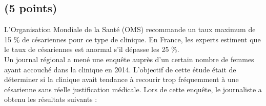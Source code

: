 \begin{questions}
\end{questions}

\subsection{(5 points)}

L'Organisation Mondiale de la Santé (OMS) recommande un taux maximum de 15 \% de césariennes pour ce type de clinique. En France, les experts estiment que le taux de césariennes est anormal s'il dépasse les 25 \%.\\

Un journal régional a mené une enquête auprès d'un certain nombre de femmes ayant accouché dans la clinique en 2014. L'objectif de cette étude était de déterminer si la clinique avait tendance à recourir trop fréquemment à une césarienne sans réelle justification médicale. Lors de cette enquête, le journaliste a obtenu les résultats suivants :

